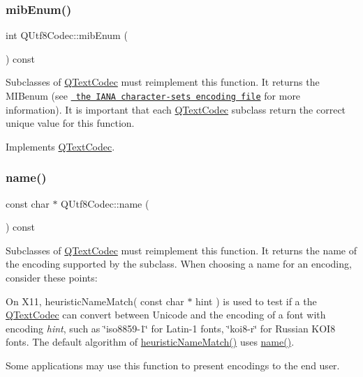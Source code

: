 \mbox{\label{class_q_utf8_codec_aab3ccc43cc2595bc81e5fbf2d5b2776a}} 
\subsubsection{\texorpdfstring{mibEnum()}{mibEnum()}}
{\footnotesize\ttfamily int Q\+Utf8\+Codec\+::mib\+Enum (\begin{DoxyParamCaption}{ }\end{DoxyParamCaption}) const\hspace{0.3cm}{\ttfamily [virtual]}}

Subclasses of \mbox{\hyperlink{class_q_text_codec}{Q\+Text\+Codec}} must reimplement this function. It returns the M\+I\+Benum (see \href{ftp://ftp.isi.edu/in-notes/iana/assignments/character-sets}{\texttt{ the I\+A\+NA character-\/sets encoding file}} for more information). It is important that each \mbox{\hyperlink{class_q_text_codec}{Q\+Text\+Codec}} subclass return the correct unique value for this function. 

Implements \mbox{\hyperlink{class_q_text_codec_aa0118daa4f82235ae9d5bb70a168c992}{Q\+Text\+Codec}}.

\mbox{\label{class_q_utf8_codec_a9857944175edc61a1e568a2503a5c434}} 
\subsubsection{\texorpdfstring{name()}{name()}}
{\footnotesize\ttfamily const char $\ast$ Q\+Utf8\+Codec\+::name (\begin{DoxyParamCaption}{ }\end{DoxyParamCaption}) const\hspace{0.3cm}{\ttfamily [virtual]}}

Subclasses of \mbox{\hyperlink{class_q_text_codec}{Q\+Text\+Codec}} must reimplement this function. It returns the name of the encoding supported by the subclass. When choosing a name for an encoding, consider these points\+: 
\begin{DoxyItemize}
\item On X11, heuristic\+Name\+Match( const char $\ast$ hint ) is used to test if a the \mbox{\hyperlink{class_q_text_codec}{Q\+Text\+Codec}} can convert between Unicode and the encoding of a font with encoding {\itshape hint}, such as \char`\"{}iso8859-\/1\char`\"{} for Latin-\/1 fonts, \char`\"{}koi8-\/r\char`\"{} for Russian K\+O\+I8 fonts. The default algorithm of \mbox{\hyperlink{class_q_text_codec_a1bcf2f11fac6113fd6ae74dda55b2ca4}{heuristic\+Name\+Match()}} uses \mbox{\hyperlink{class_q_utf8_codec_a9857944175edc61a1e568a2503a5c434}{name()}}. 
\item Some applications may use this function to present encodings to the end user. 
\end{DoxyItemize}

